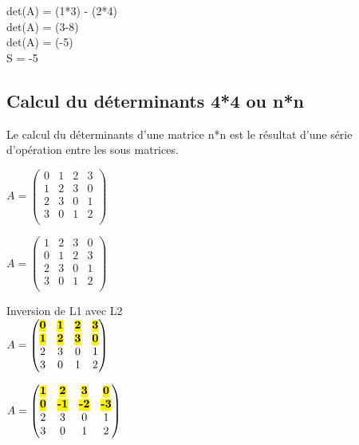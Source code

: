 det(A) = (1*3) - (2*4)\\

det(A) = (3-8)\\

det(A) = (-5)\\

S = -5\\

\subsection{Calcul du déterminants 4*4 ou n*n}
\vspace{5mm} %
Le calcul du déterminants d'une matrice n*n est le résultat d'une série d'opération entre les sous matrices.
\vspace{5mm} %

$
A =
\begin{pmatrix}
  0 & 1 & 2 & 3 \\
  1 & 2 & 3 & 0 \\
  2 & 3 & 0 & 1 \\
  3 & 0 & 1 & 2 \\
\end{pmatrix}
$

\vspace{10mm} %


$
A =
\begin{pmatrix}
  1 & 2 & 3 & 0 \\
  0 & 1 & 2 & 3 \\
  2 & 3 & 0 & 1 \\
  3 & 0 & 1 & 2 \\
\end{pmatrix}
$

\vspace{10mm} %
Inversion de L1 avec L2\\

$
A =
\begin{pmatrix}
  \hl{\textbf{0}} & \hl{\textbf{1}} & \hl{\textbf{2}} & \hl{\textbf{3}} \\
  \hl{\textbf{1}} & \hl{\textbf{2}} & \hl{\textbf{3}} & \hl{\textbf{0}} \\
  2 & 3 & 0 & 1 \\
  3 & 0 & 1 & 2 \\
\end{pmatrix}
$
\vspace{5mm} %

$
A =
\begin{pmatrix}
  \hl{\textbf{1}} & \hl{\textbf{2}} & \hl{\textbf{3}} & \hl{\textbf{0}} \\
  \hl{\textbf{0}} & \hl{\textbf{-1}} & \hl{\textbf{-2}} & \hl{\textbf{-3}} \\
  2 & 3 & 0 & 1 \\
  3 & 0 & 1 & 2 \\
\end{pmatrix}
$

